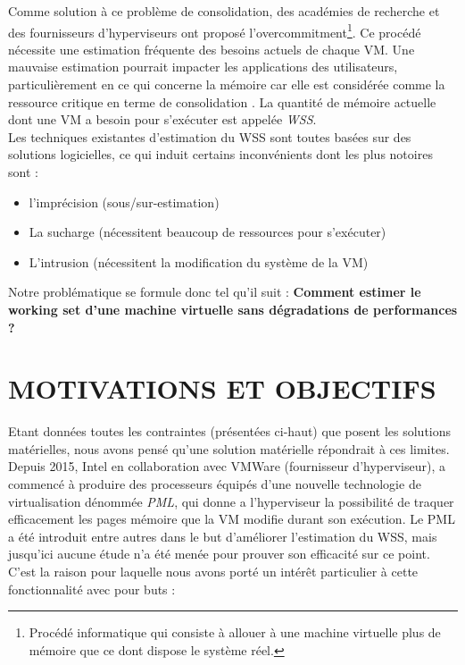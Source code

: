 Comme solution à ce problème de consolidation, des académies de recherche et des fournisseurs d'hyperviseurs ont proposé l'overcommitment\footnote{Procédé informatique qui consiste à allouer à une machine virtuelle plus de mémoire que ce dont dispose le système réel.}. Ce procédé nécessite une estimation fréquente des besoins actuels de chaque VM. Une mauvaise estimation pourrait impacter les applications des utilisateurs, particulièrement en ce qui concerne la mémoire car elle est considérée comme la ressource critique en terme de consolidation \cite{article1}. La quantité de mémoire actuelle dont une VM a besoin pour s'exécuter est appelée \textit{\ac{WSS}}.\\
Les techniques existantes d'estimation du WSS sont toutes basées sur des solutions logicielles, ce qui induit certains inconvénients dont les plus notoires sont : 

\begin{itemize}[label=, font=\large \color{darkorange}]
    \item l'imprécision (sous/sur-estimation)
    \item La sucharge (nécessitent beaucoup de ressources pour s'exécuter)
    \item L'intrusion (nécessitent la modification du système de la VM)
\end{itemize}

Notre problématique se formule donc tel qu'il suit : \textbf{Comment estimer le working set d'une machine virtuelle sans dégradations de performances ?}

\section*{MOTIVATIONS ET OBJECTIFS}

Etant données toutes les contraintes (présentées ci-haut) que posent les solutions matérielles, nous avons pensé qu'une solution matérielle répondrait à ces limites.\\
Depuis 2015, Intel en collaboration avec VMWare (fournisseur d'hyperviseur), a commencé à produire des processeurs équipés d'une nouvelle technologie de virtualisation dénommée \textit{\ac{PML}}, qui donne a l'hyperviseur la possibilité de traquer efficacement les pages mémoire que la VM modifie durant son exécution. Le PML a été introduit entre autres dans le but d'améliorer l'estimation du WSS, mais jusqu'ici aucune étude n'a été menée pour prouver son efficacité sur ce point. C'est la raison pour laquelle nous avons porté un intérêt particulier à cette fonctionnalité avec pour buts :

